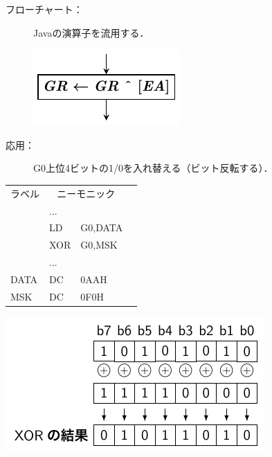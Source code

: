 \documentclass{beamer}                 %
\begin{document}
\begin{frame}
  \begin{description}
  \item[フローチャート：] Javaの演算子を流用する．\\
  \vfill
    \centerline{\includegraphics[scale=0.7]{../Tikz/xor_chap5.pdf}}
  \vfill
  \item[応用：] G0上位4ビットの1/0を入れ替える（ビット反転する）．
  \end{description}
  \vfill
  \begin{minipage}{0.48\columnwidth}
    {\ttfamily\small\begin{center}
      \begin{tabular}{|l|l l|l}
        \cline{1-3}
        ラベル & \multicolumn{2}{|c|}{ニーモニック} & \\
        \cline{1-3}
        & ...  &        & \\
        & LD   & G0,DATA& \\
        & XOR  & G0,MSK & \\
        & ...  &        & \\
        DATA& DC   & 0AAH    & \\
        MSK & DC   & 0F0H    & \\
        \cline{1-3}
      \end{tabular}
    \end{center}}
  \end{minipage}
  \begin{minipage}{0.48\columnwidth}
    \centerline{\includegraphics[scale=0.8]{../Tikz/lxor.pdf}}
  \end{minipage}
  \vfill
\end{frame}
\end{document}

